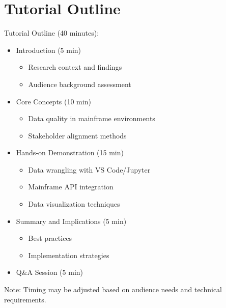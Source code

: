 \documentclass[a4paper]{article}
\begin{document}
\section{Tutorial Outline}
Tutorial Outline (40 minutes):
\begin{itemize}
    \item Introduction (5 min)
    \begin{itemize}
        \item Research context and findings
        \item Audience background assessment
    \end{itemize}
    \item Core Concepts (10 min)
    \begin{itemize}
        \item Data quality in mainframe environments
        \item Stakeholder alignment methods
    \end{itemize}
    \item Hands-on Demonstration (15 min)
    \begin{itemize}
        \item Data wrangling with VS Code/Jupyter
        \item Mainframe API integration
        \item Data visualization techniques
    \end{itemize}
    \item Summary and Implications (5 min)
        \begin{itemize}
            \item Best practices
            \item Implementation strategies
        \end{itemize}
    \item Q\&A Session (5 min)
\end{itemize}

Note: Timing may be adjusted based on audience needs and technical requirements.
\end{document}
